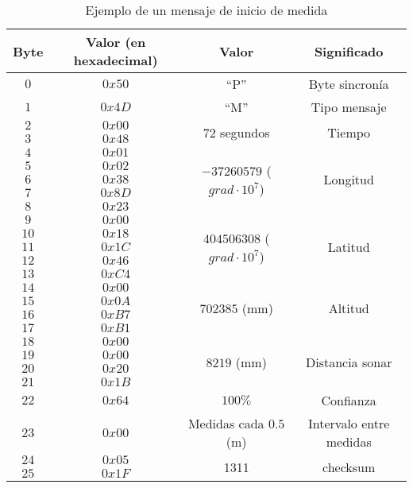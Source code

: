 \begin{table}
	\centering
	\caption{Ejemplo de un mensaje de inicio de medida}
	\begin{tabular}{|c|c|c|c|}\hline
		\textbf{Byte} 	&	\textbf{Valor (en hexadecimal)}	&\textbf{Valor}	&\textbf{Significado} \\ \hline \hline
		$0$ 			&  $0x50$			& ``P''	& Byte sincronía	\\ \hline
		$1$				&  $0x4D$			& ``M''	& Tipo mensaje		\\ \hline
		$2$				&  $0x00$			& \multirow{2}{*}{$72$ segundos} & \multirow{2}{*}{Tiempo} \\
		$3$				&  $0x48$			&  & \\ \hline	
		$4$				&  $0x01$			&  \multirow{5}{*}{$-37260579$ ($grad \cdot 10^{7}$) } &  \multirow{5}{*}{Longitud}  \\
		$5$				&  $0x02$			&  &   \\ 	
		$6$				&  $0x38$			&  &    \\ 	
		$7$				&  $0x8D$			&  &    \\ 	
		$8$				&  $0x23$			&   &   \\ \hline
		$9$				&  $0x00$			& \multirow{5}{*}{$404506308$ ($grad \cdot 10^{7}$) } &  \multirow{5}{*}{Latitud}   \\
		$10$				&  $0x18$			&  &     \\ 	
		$11$				&  $0x1C$			&  &      \\ 	
		$12$				&  $0x46$			&  &      \\ 	
		$13$				&  $0xC4$			&  &      \\ \hline
		$14$				&  $0x00$			& \multirow{4}{*}{$702385$ (mm) } & \multirow{4}{*}{Altitud}\\
		$15$				&  $0x0A$			&   &     \\ 	
		$16$				&  $0xB7$			&   &         \\ 	
		$17$				&  $0xB1$			&   &        \\ \hline
		$18$				&  $0x00$			& \multirow{4}{*}{$8219$ (mm) } & \multirow{4}{*}{Distancia sonar}\\
		$19$				&  $0x00$			&     &     \\ 	
		$20$				&  $0x20$			&     &     \\ 	
		$21$				&  $0x1B$			&     &     \\ 	\hline
		$22$				&  $0x64$			& $100 \%$ &     Confianza \\ \hline
		$23$				&  $0x00$			& Medidas cada $0.5$ (m) &     Intervalo entre medidas \\ \hline
		$24$				&  $0x05$			&  \multirow{2}{*}{1311}	& \multirow{2}{*}{checksum} \\
		$25$				&  $0x1F$			&     &     \\ \hline	
		
		
	\end{tabular}
	\label{tab:5}
\end{table}

